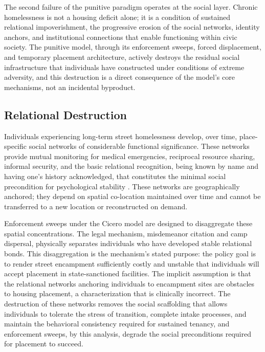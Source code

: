 \documentclass[12pt, letterpaper]{article}
\begin{document}
The second failure of the punitive paradigm operates at the social layer. Chronic homelessness is not a housing deficit alone; it is a condition of sustained relational impoverishment, the progressive erosion of the social networks, identity anchors, and institutional connections that enable functioning within civic society. The punitive model, through its enforcement sweeps, forced displacement, and temporary placement architecture, actively destroys the residual social infrastructure that individuals have constructed under conditions of extreme adversity, and this destruction is a direct consequence of the model's core mechanisms, not an incidental byproduct.

\subsection{Relational Destruction}

Individuals experiencing long-term street homelessness develop, over time, place-specific social networks of considerable functional significance. These networks provide mutual monitoring for medical emergencies, reciprocal resource sharing, informal security, and the basic relational recognition, being known by name and having one's history acknowledged, that constitutes the minimal social precondition for psychological stability \citep{dibella_wp1_2026}. These networks are geographically anchored; they depend on spatial co-location maintained over time and cannot be transferred to a new location or reconstructed on demand.

Enforcement sweeps under the Cicero model are designed to disaggregate these spatial concentrations. The legal mechanism, misdemeanor citation and camp dispersal, physically separates individuals who have developed stable relational bonds. This disaggregation is the mechanism's stated purpose: the policy goal is to render street encampment sufficiently costly and unstable that individuals will accept placement in state-sanctioned facilities. The implicit assumption is that the relational networks anchoring individuals to encampment sites are obstacles to housing placement, a characterization that is clinically incorrect. The destruction of these networks removes the social scaffolding that allows individuals to tolerate the stress of transition, complete intake processes, and maintain the behavioral consistency required for sustained tenancy, and enforcement sweeps, by this analysis, degrade the social preconditions required for placement to succeed.
\end{document}

